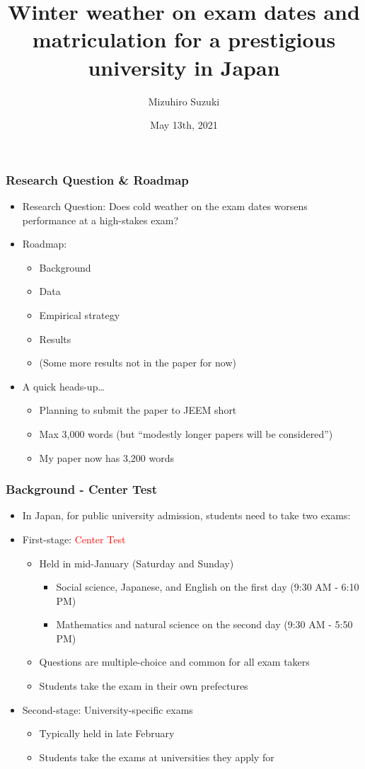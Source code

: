 \documentclass[10pt, pdfmx,hiresbb]{beamer}
\title[Temperature and Exam]{Winter weather on exam dates and matriculation for a prestigious university in Japan}
\author[Suzuki]{Mizuhiro Suzuki}
\date{May 13th, 2021}
\begin{document}
\begin{frame}
\titlepage
\end{frame}

\begin{frame}\frametitle{Research Question \& Roadmap}
  \begin{itemize}
    \item Research Question: Does cold weather on the exam dates worsens performance at a high-stakes exam?
    \item Roadmap:
      \begin{itemize}
        \item Background
        \item Data
        \item Empirical strategy
        \item Results
        \item (Some more results not in the paper for now)
      \end{itemize}
    \item A quick heads-up\dots
      \begin{itemize}
        \item Planning to submit the paper to JEEM short 
        \item Max 3,000 words (but ``modestly longer papers will be considered'')
        \item My paper now has 3,200 words
      \end{itemize}
  \end{itemize}
\end{frame}

\begin{frame}\frametitle{Background - Center Test}
  \begin{itemize}
    \item In Japan, for public university admission, students need to take two exams:
    \item First-stage: \textcolor{red}{Center Test}
      \begin{itemize}
        \item Held in mid-January (Saturday and Sunday)
          \begin{itemize}
            \item Social science, Japanese, and English on the first day (9:30 AM - 6:10 PM)
            \item Mathematics and natural science on the second day (9:30 AM - 5:50 PM)
          \end{itemize}
        \item Questions are multiple-choice and common for all exam takers
        \item Students take the exam in their own prefectures
      \end{itemize}
    \item Second-stage: University-specific exams
      \begin{itemize}
        \item Typically held in late February
        \item Students take the exams at universities they apply for
      \end{itemize}
  \end{itemize}
\end{frame}
\end{document}
